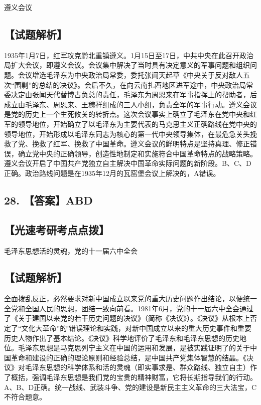 \documentclass[UTF8,11pt]{ctexart}
\begin{document}
遵义会议


\subsection*{【试题解析】}

1935年1月7日，红军攻克黔北重镇遵义。1月15日至17日，中共中央在此召开政治局扩大会议，即遵义会议。会议集中解决了当时具有决定意义的军事问题和组织问题。会议增选毛泽东为中央政治局常委，委托张闻天起草《中央关于反对敌人五次“围剿”的总结的决议》。会后不久，在向云南扎西地区进军途中，中央政治局常委决定由张闻天代替博古负总的责任，毛泽东为周恩来在军事指挥上的帮助者，后成立由毛泽东、周恩来、王稼祥组成的三人小组，负责全军的军事行动。遵义会议是党的历史上一个生死攸关的转折点。这次会议事实上确立了毛泽东在党中央和红军的领导地位，开始确立了以毛泽东为主要代表的马克思主义正确路线在党中央的领导地位，开始形成以毛泽东同志为核心的第一代中央领导集体，在最危急关头挽救了党、挽救了红军、挽救了中国革命。遵义会议的鲜明特点是坚持真理、修正错误，确立党中央的正确领导，创造性地制定和实施符合中国革命特点的战略策略。遵义会议开启了中国共产党独立自主解决中国革命实际问题的新阶段。B、C、D正确。政治路线问题是在1935年12月的瓦窑堡会议上解决的，A错误。


\subsection*{28. 【答案】ABD}

\subsection*{【光速考研考点点拨】}

毛泽东思想活的灵魂，党的十一届六中全会


\subsection*{【试题解析】}

全面拨乱反正，必然要求对新中国成立以来党的重大历史问题作出结论，以便统一全党和全国人民的思想，团结一致向前看。1981年6月，党的十一届六中全会通过了《关于建国以来党的若干历史问题的决议》（简称《决议》）。《决议》从根本上否定了“文化大革命”的'错误理论和实践，对新中国成立以来的重大历史事件和重要历史人物作出了基本结论。《决议》科学地评价了毛泽东和毛泽东思想的历史地位。毛泽东思想是马克思列宁主义在中国的运用和发展，是被实践证明了的关于中国革命和建设的正确的理论原则和经验总结，是中国共产党集体智慧的结晶。《决议》对毛泽东思想的科学体系和活的灵魂（即实事求是、群众路线、独立自主）作了概括，强调毛泽东思想是我们党的宝贵的精神财富，它将长期指导我们的行动。A、B、D正确。统一战线、武装斗争、党的建设是新民主主义革命的三大法宝，C不符合题意。
\end{document}
